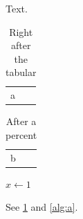 \documentclass{article}
\begin{document}
Text.
\begin{table}[h]
\centering
\begin{tabular}{l}
a \\
\end{tabular}
\caption{Right after the tabular}
\label{t}
\end{table}
\begin{table}[h]
\centering
\begin{tabular}{l}
b \\
\end{tabular}%
\caption{After a percent}
\end{table}
\begin{algorithm}[h]
\caption{An algorithm}
\label{alg:a}
\begin{algorithmic}
\State $x \gets 1$
\end{algorithmic}
\end{algorithm}
See \ref{t} and \ref{alg:a}.
\end{document}
